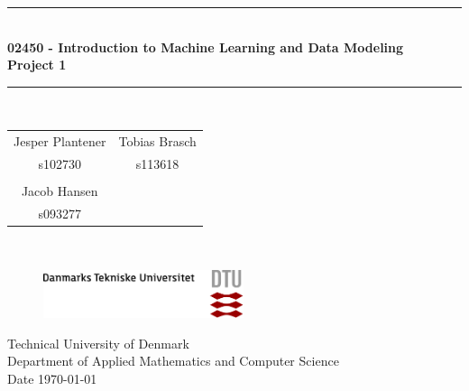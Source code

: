 \begin{titlepage}
\centering \parindent=0pt
\newcommand{\HRule}{\rule{\textwidth}{1mm}}
 \HRule\\[1cm]\Huge\bfseries
02450 - Introduction to Machine Learning and Data Modeling \\ [0.4cm] \Large Project 1\\ [0.7cm]
\HRule\\[2cm]
\large


\begin{tabular}{cc}
Jesper Plantener \qquad &  \qquad Tobias Brasch \\
s102730 & \qquad s113618 \\
\\
Jacob Hansen \\
s093277 \\
\end{tabular}\\[2cm]
 \normalsize

\begin{figure}[!h]
\raggedleft
\includegraphics[height=40pt]{pictures/DTU-logo-farve.png}
\end{figure}

\begin{flushleft}
Technical University of Denmark\\
Department of Applied Mathematics and Computer Science\\
Date \today \end{flushleft}
\end{titlepage}


